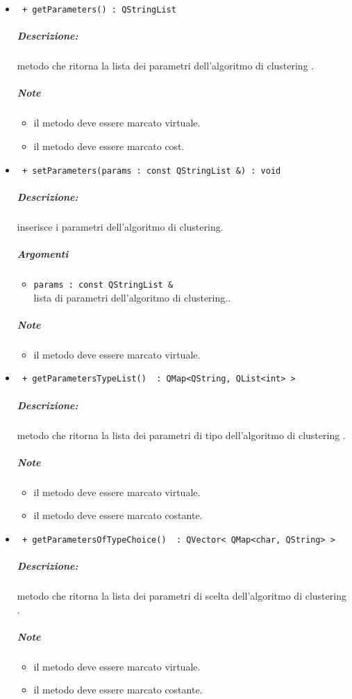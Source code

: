 \begin{itemize}
	\item \color{blue}\verb! + getParameters() : QStringList!
		\color{black}
		\subparagraph{Descrizione:} metodo che ritorna la lista dei parametri dell'algoritmo di clustering\g{} .
		\subparagraph{Note}
			\begin{itemize}
				\item il metodo deve essere marcato virtuale.
				\item il metodo deve essere marcato cost.
			\end{itemize}
			
	\item \color{blue}\verb! + setParameters(params : const QStringList &) : void!
		\color{black}
		\subparagraph{Descrizione:} inserisce i parametri dell'algoritmo di clustering\g{}.
		\subparagraph{Argomenti}
			\begin{itemize}
				\item \color{RoyalPurple} \verb!params : const QStringList & ! \\ 
				\color{black} lista di parametri dell'algoritmo di clustering\g{}..		
			\end{itemize}
		\subparagraph{Note}
			\begin{itemize}
				\item il metodo deve essere marcato virtuale.
			\end{itemize}
					
	\item \color{blue}\verb! + getParametersTypeList()  : QMap<QString, QList<int> >!
		\color{black}
		\subparagraph{Descrizione:} metodo che ritorna la lista dei parametri di tipo dell'algoritmo di clustering\g{} .
		\subparagraph{Note}
			\begin{itemize}
				\item il metodo deve essere marcato virtuale.
				\item il metodo deve essere marcato costante.
			\end{itemize}	
			
	\item \color{blue}\verb! + getParametersOfTypeChoice()  : QVector< QMap<char, QString> >!
		\color{black}
		\subparagraph{Descrizione:} metodo che ritorna la lista dei parametri di scelta dell'algoritmo di clustering\g{} .
		\subparagraph{Note}
			\begin{itemize}
				\item il metodo deve essere marcato virtuale.
				\item il metodo deve essere marcato costante.
			\end{itemize}	
	

\end{itemize}
